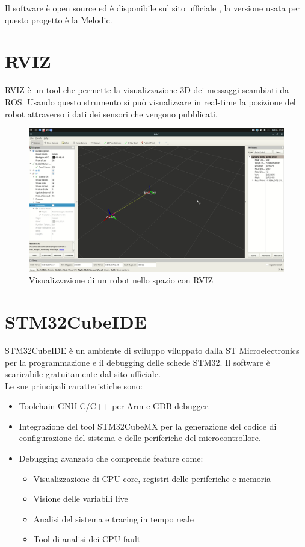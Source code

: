 Il software è open source ed è disponibile sul sito ufficiale \cite{ROS}, la versione usata per questo progetto è la Melodic.

\section{RVIZ}
RVIZ è un tool che permette la visualizzazione 3D dei messaggi scambiati da ROS. Usando questo strumento si può visualizzare in real-time la posizione del robot attraverso i dati dei sensori che vengono pubblicati.

\begin{figure}[H]
\centering
\includegraphics[scale=0.225]{images/rviz.png}
\caption{Visualizzazione di un robot nello spazio con RVIZ}
\end{figure}

\section{STM32CubeIDE}
STM32CubeIDE è un ambiente di sviluppo viluppato dalla ST Microelectronics per la programmazione e il debugging delle schede STM32. Il software è scaricabile gratuitamente dal sito ufficiale\cite{STM32CubeIDE}. \\
Le sue principali caratteristiche sono:
\begin{itemize}
    \item Toolchain GNU C/C++ per Arm e GDB debugger.
    \item Integrazione del tool STM32CubeMX per la generazione del codice di configurazione del sistema e delle periferiche del microcontrollore.
    \item Debugging avanzato che comprende feature come:
    \begin{itemize}
        \item Visualizzazione di CPU core, registri delle periferiche e memoria
        \item Visione delle variabili live 
        \item Analisi del sistema e tracing in tempo reale
        \item Tool di analisi dei CPU fault
    \end{itemize}
\end{itemize}

